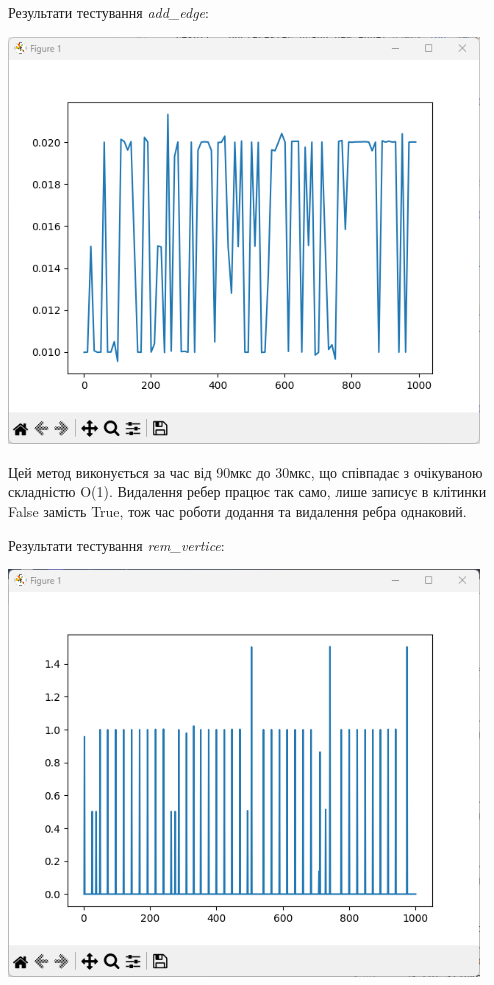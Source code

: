 \documentclass{article}
\begin{document}
Результати тестування \textit{add\_edge}:
\begin{center}
    \includegraphics[width=125mm]{newedge}
\end{center}\indent

Цей метод виконується за час від 90мкс до 30мкс, що співпадає з очікуваною складністю O(1). Видалення ребер працює так само, лише записує в клітинки False замість True, тож час роботи додання та видалення ребра однаковий.
\newpage

Результати тестування \textit{rem\_vertice}:
\begin{center}
    \includegraphics[width=125mm]{remvertice}
\end{center}\indent
\end{document}
